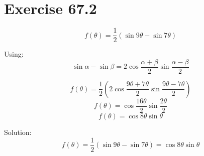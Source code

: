 \documentclass[a4paper, 10pt]{scrartcl}
\begin{document}
\section{Exercise 67.2}

\[f(\theta) = \frac{1}{2}(\sin{9\theta} - \sin{7\theta})\]

Using:
\[\sin{\alpha} - \sin{\beta} = 2\cos{\frac{\alpha + \beta}{2}}\sin{\frac{\alpha - \beta}{2}}\]

\[f(\theta) = \frac{1}{2}(2\cos{\frac{9\theta + 7\theta}{2}}\sin{\frac{9\theta - 7\theta}{2}})\]
\[f(\theta) = \cos{\frac{16\theta}{2}}\sin{\frac{2\theta}{2}}\]
\[f(\theta) = \cos{8\theta}\sin{\theta}\]

Solution:
\[f(\theta) = \frac{1}{2}(\sin{9\theta} - \sin{7\theta}) = \cos{8\theta}\sin{\theta}\]
\end{document}
